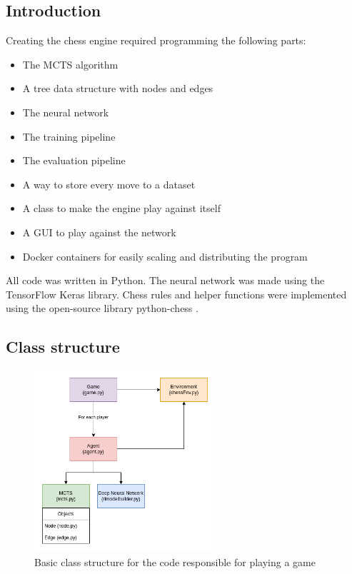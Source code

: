 \documentclass{article}
\begin{document}
\subsection{Introduction}

Creating the chess engine required programming the following parts:

\begin{itemize}
    \item The MCTS algorithm
    \item A tree data structure with nodes and edges
    \item The neural network
    \item The training pipeline
    \item The evaluation pipeline
    \item A way to store every move to a dataset
    \item A class to make the engine play against itself
    \item A GUI to play against the network
    \item Docker containers for easily scaling and distributing the program
\end{itemize}

All code was written in Python. The neural network was made using the TensorFlow Keras library.
Chess rules and helper functions were implemented using the open-source library python-chess \cite{PythonchessChessLibrarya}.

\subsection{Class structure}

\begin{figure}[H]
    \centering
    \includegraphics[width=0.6\textwidth]{img/class-structure.png}
    \caption{Basic class structure for the code responsible for playing a game}
\end{figure}
\end{document}
